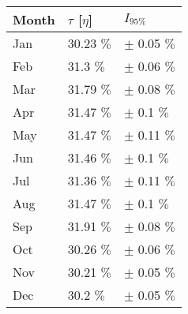 \begin{tabular}{lll}
\toprule
Month & $\tau$ [$\eta$] &       $I_{95\%}$ \\
\midrule
  Jan &      30.23 $\%$ &  $\pm$ 0.05 $\%$ \\
  Feb &       31.3 $\%$ &  $\pm$ 0.06 $\%$ \\
  Mar &      31.79 $\%$ &  $\pm$ 0.08 $\%$ \\
  Apr &      31.47 $\%$ &   $\pm$ 0.1 $\%$ \\
  May &      31.47 $\%$ &  $\pm$ 0.11 $\%$ \\
  Jun &      31.46 $\%$ &   $\pm$ 0.1 $\%$ \\
  Jul &      31.36 $\%$ &  $\pm$ 0.11 $\%$ \\
  Aug &      31.47 $\%$ &   $\pm$ 0.1 $\%$ \\
  Sep &      31.91 $\%$ &  $\pm$ 0.08 $\%$ \\
  Oct &      30.26 $\%$ &  $\pm$ 0.06 $\%$ \\
  Nov &      30.21 $\%$ &  $\pm$ 0.05 $\%$ \\
  Dec &       30.2 $\%$ &  $\pm$ 0.05 $\%$ \\
\bottomrule
\end{tabular}
